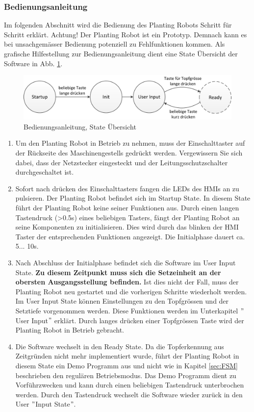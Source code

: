 \subsubsection{Bedienungsanleitung}
Im folgenden Abschnitt wird die Bedienung des Planting Robots Schritt für Schritt erklärt. Achtung! Der Planting Robot ist ein Prototyp. Demnach kann es bei unsachgemässer Bedienung potenziell zu Fehlfunktionen kommen. Als grafische Hilfestellung zur Bedienungsanleitung dient eine State Übersicht der Software in Abb. \ref{fig:Bedienungsanleitung}.

\begin{figure}[H]
	\includegraphics[width=1\textwidth]{Illustrationen/6-Umsetzung/Bedienungsanleitung.png}
	\caption{Bedienungsanleitung, State Übersicht}
	\label{fig:Bedienungsanleitung}
\end{figure}

\begin{enumerate}
	\item Um den Planting Robot in Betrieb zu nehmen, muss der Einschalttaster auf der Rückseite des Maschinengestells gedrückt werden. Vergewissern Sie sich dabei, dass der Netzstecker eingesteckt und der Leitungsschutzschalter durchgeschaltet ist.
	\item Sofort nach drücken des Einschalttasters fangen die LEDs des HMIs an zu pulsieren. Der Planting Robot befindet sich im Startup State. In diesem State führt der Planting Robot keine seiner Funktionen aus. Durch einen langen Tastendruck (>0.5s) eines beliebigen Tasters, fängt der Planting Robot an seine Komponenten zu initialisieren. Dies wird durch das blinken der HMI Taster der entsprechenden Funktionen angezeigt. Die Initialphase dauert ca. 5... 10s.
	\item Nach Abschluss der Initialphase befindet sich die Software im User Input State. \textbf{Zu diesem Zeitpunkt muss sich die Setzeinheit an der obersten Ausgangsstellung befinden.} Ist dies nicht der Fall, muss der Planting Robot neu gestartet und die vorherigen Schritte wiederholt werden. Im User Input State können Einstellungen zu den Topfgrössen und der Setztiefe vorgenommen werden. Diese Funktionen werden im Unterkapitel $"$User Input$"$ erklärt. Durch langes drücken einer Topfgrössen Taste wird der Planting Robot in Betrieb gebracht.
	\item Die Software wechselt in den Ready State. Da die Topferkennung aus Zeitgründen nicht mehr implementiert wurde, führt der Planting Robot in diesem State ein Demo Programm aus und nicht wie in Kapitel \ref{sec:FSM} beschrieben den regulären Betriebsmodus. Das Demo Programm dient zu Vorführzwecken und kann durch einen beliebigen Tastendruck unterbrochen werden. Durch den Tastendruck wechselt die Software wieder zurück in den User $"$Input State$"$.
\end{enumerate}

